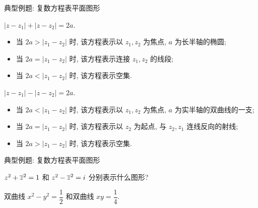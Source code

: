 \begin{frame}{典型例题: 复数方程表平面图形}
	\onslide<+->
	\begin{example*}
		$|z-z_1|+|z-z_2|=2a$.
		\begin{itemize}
			\item 当 $2a>|z_1-z_2|$ 时, 该方程表示以 $z_1,z_2$ 为焦点, $a$ 为长半轴的椭圆;
			\item 当 $2a=|z_1-z_2|$ 时, 该方程表示连接 $z_1,z_2$ 的线段;
			\item 当 $2a<|z_1-z_2|$ 时, 该方程表示空集.	
		\end{itemize}
	\end{example*}
	\onslide<+->
	\begin{example*}
		$|z-z_1|-|z-z_2|=2a$.
		\begin{itemize}
			\item 当 $2a<|z_1-z_2|$ 时, 该方程表示以 $z_1,z_2$ 为焦点, $a$ 为实半轴的双曲线的一支;
			\item 当 $2a=|z_1-z_2|$ 时, 该方程表示以 $z_2$ 为起点, 与 $z_2,z_1$ 连线反向的射线;
			\item 当 $2a>|z_1-z_2|$ 时, 该方程表示空集.	
		\end{itemize}
	\end{example*}
\end{frame}


\begin{frame}{典型例题: 复数方程表平面图形}
	\onslide<+->
	\begin{exercise}
		$z^2+\overline z^2=1$ 和 $z^2-\overline z^2=i$ 分别表示什么图形?
	\end{exercise}

	\onslide<+->
	\begin{answer}
		双曲线 $x^2-y^2=\dfrac12$ 和双曲线 $xy=\dfrac14$.
	\end{answer}
\end{frame}

